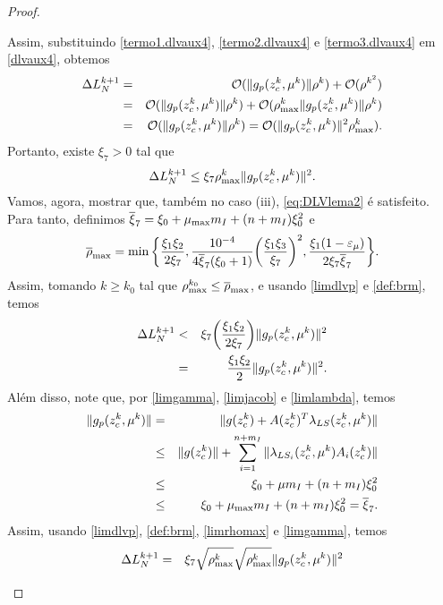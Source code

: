 \begin{proof}
\begin{description}
Assim, substituindo \eqref{termo1.dlvaux4}, \eqref{termo2.dlvaux4} e 
\eqref{termo3.dlvaux4} em \eqref{dlvaux4}, obtemos 
\begin{eqnarray*} \Delta L_N^{k+1} & = &
\mathcal{O}(\Vert g_p(z_c^{k},\mu^k)\Vert\rho^k) + \mathcal{O}(\rho^{k^2}) \\
& = & \mathcal{O}(\Vert g_p(z_c^{k},\mu^k)\Vert\rho^k) + \mathcal{O}(\rho_{\max}^k\Vert g_p(z_c^{k},
\mu^k)\Vert\rho^k) \\
& = & \mathcal{O}(\Vert g_p(z_c^{k},\mu^k)\Vert\rho^k) =
\mathcal{O}(\Vert g_p(z_c^{k},\mu^k)\Vert^2\rho_{\max}^k). 
\end{eqnarray*} 
Portanto, existe $\xi_7 > 0$ tal que 
\begin{eqnarray} \DLV{k+1} \leq
\xi_7\rhomax^k\norma{g_p(\zc{k},\mu^k)}^2.\visiblelbl{limdlvp} \end{eqnarray}
Vamos, agora, mostrar que, também no caso (iii), \eqref{eq:DLVlema2} é
satisfeito. Para tanto,
definimos $\overline{\xi}_7 = \xi_0 + \mu_{\max}m_I + (n+m_I)\xi_0^2$ e
\begin{eqnarray} \brm =
  \min\bigg\{\frac{\xi_1\xi_2}{2\xi_7},\frac{10^{-4}}{4\bxi_7(\xi_0 + 1)}
  \bigg(\frac{\xi_1\xi_3} {\xi_7}\bigg)^2,
  \frac{\xi_1(1-\epsmu)}{2\xi_7\bxi_7}\bigg\}.\visiblelbl{def:brm} 
\end{eqnarray}
Assim, tomando $k \geq k_0$ tal que $\rho_{\max}^{k_0} \leq \overline{\rho}_{\max}$, e usando
\eqref{limdlvp} e \eqref{def:brm}, temos 
\begin{eqnarray*} 
  \Delta L_N^{k+1} & < &
  \xi_7\bigg(\frac{\xi_1\xi_2}{2\xi_7}\bigg)\Vert g_p(z_c^{k},\mu^k)\Vert^2 \\
  & = & \frac{\xi_1\xi_2}{2}\Vert g_p(z_c^{k},\mu^k)\Vert^2.  
\end{eqnarray*} 
Além disso, note que, por \eqref{limgamma}, \eqref{limjacob} e
\eqref{limlambda}, temos
\begin{eqnarray*} 
  \Vert g_p(z_c^{k},\mu^k)\Vert & = & \Vert g(z_c^{k}) +
    A(z_c^{k})^T\lambda_{LS}(z_c^{k},\mu^k)\Vert \\
  & \leq & \Vert g(z_c^{k})\Vert +
    \sum_{i=1}^{n+m_I}\Vert \lambda_{LS_i}(z_c^{k},\mu^k) A_i(z_c^{k})\Vert \\
  & \leq & \xi_0 + \mu m_I + (n + m_I) \xi_0^2  \\
  & \leq & \xi_0 + \mu_{\max}m_I +
    (n+m_I)\xi_0^2 = \overline{\xi}_7.
\end{eqnarray*} 
Assim, usando \eqref{limdlvp}, \eqref{def:brm},
\eqref{limrhomax} e \eqref{limgamma}, temos 
\begin{eqnarray*} 
  \DLV{k+1} & = & \xi_7\sqrt{\rhomax^k}
    \sqrt{\rhomax^k}\norma{g_p(\zc{k},\mu^k)}^2 \\ 

\end{eqnarray*}
\end{description}
\end{proof}
